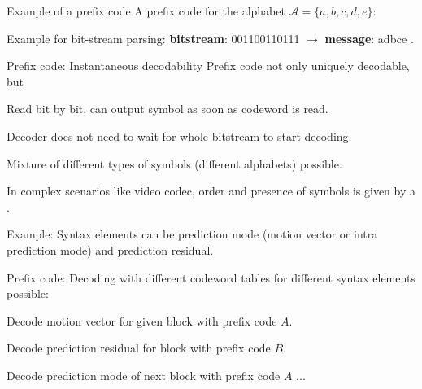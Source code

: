\begin{frame}{Example of a prefix code}
A prefix code for the alphabet $\mathcal{A}=\{a,b,c,d,e\}$:
\begin{figure}
\end{figure}
Example for bit-stream parsing: \textbf{bitstream}: 001100110111 $\mathbf{\rightarrow}$ \textbf{message}: adbce .
\end{frame}

\begin{frame}{Prefix code: Instantaneous decodability}
Prefix code not only uniquely decodable, but 
\bit
\item Read bit by bit, can output symbol as soon as codeword is read. 
\item {} Decoder does not need to wait for whole bitstream to start decoding.
\eit 

\bit
\item Mixture of different types of symbols (different alphabets) possible. 
\item In complex scenarios like video codec, order and presence of symbols is given by a . 
\item Example: Syntax elements can be prediction mode (motion vector or intra prediction mode) and prediction residual. 
\item Prefix code: Decoding with different codeword tables for different syntax elements possible:
\bit
\item Decode motion vector for given block with prefix code $A$.  
\item Decode prediction residual for block with prefix code $B$. 
\item Decode prediction mode of next block with prefix code $A$ ...
\eit
\eit

\end{frame}

